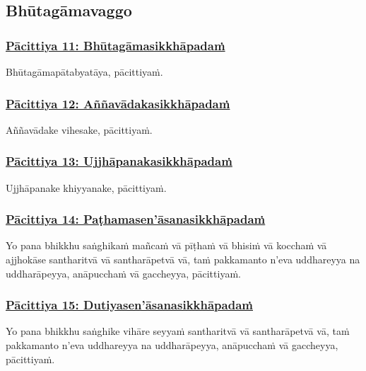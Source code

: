 \subsection{Bhūtagāmavaggo}

\subsubsection*{\hyperref[exp11]{Pācittiya 11: Bhūtagāmasikkhāpadaṁ}}
\label{pac11}

Bhūtagāmapātabyatāya, pācittiyaṁ.



\subsubsection*{\hyperref[exp12]{Pācittiya 12: Aññavādakasikkhāpadaṁ}}
\label{pac12}

Aññavādake vihesake, pācittiyaṁ.



\subsubsection*{\hyperref[exp13]{Pācittiya 13: Ujjhāpanakasikkhāpadaṁ}}
\label{pac13}

Ujjhāpanake khiyyanake, pācittiyaṁ.



\subsubsection*{\hyperref[exp14]{Pācittiya 14: Paṭhamasen'āsanasikkhāpadaṁ}}
\label{pac14}

Yo pana bhikkhu saṅghikaṁ mañcaṁ vā pīṭhaṁ vā bhisiṁ vā kocchaṁ vā ajjhokāse santharitvā vā santharāpetvā vā, taṁ pakkamanto n'eva uddhareyya na uddharāpeyya, anāpucchaṁ vā gaccheyya, pācittiyaṁ.



\subsubsection*{\hyperref[exp15]{Pācittiya 15: Dutiyasen'āsanasikkhāpadaṁ}}
\label{pac15}

Yo pana bhikkhu saṅghike vihāre seyyaṁ santharitvā vā santharāpetvā vā, taṁ pakkamanto n'eva uddhareyya na uddharāpeyya, anāpucchaṁ vā gaccheyya, pācittiyaṁ.




